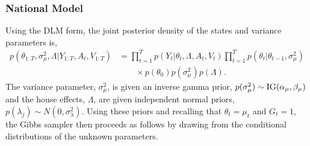 \documentclass[12pt,final,fleqn]{article}
\theoremstyle{plain}
\begin{document}
\subsubsection{National Model}
Using the DLM form, the joint posterior density of the states and variance parameters is,
\begin{align}
p(\theta_{1:T}, \sigma_\mu^2, \Lambda|Y_{1:T}, A_t, V_{1:T})&=\prod_{t=1}^T p(Y_t|\theta_t, \Lambda, A_t, V_t) \prod_{t=1}^T p(\theta_t|\theta_{t-1}, \sigma_\mu^2) \nonumber\\
&\qquad \times p(\theta_0)p(\sigma_\mu^2)p(\Lambda).
\end{align}
The variance parameter, $\sigma^2_\mu$, is given an inverse gamma prior, $p(\sigma^2_\mu)\sim\rm{IG}(\alpha_\mu, \beta_\mu)$ and the house effects, $\Lambda$, are given independent normal priors, $p(\lambda_j) \sim N(0, \sigma^2_\lambda)$. Using these priors and recalling that $\theta_t = \mu_t$ and $G_t =1$, the Gibbs sampler then proceeds as follows by drawing from the conditional distributions of the unknown parameters.
\end{document}
